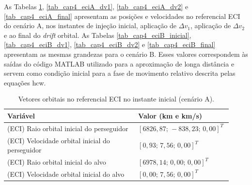 \label{ap_ApendiceA}

As Tabelas \ref{tab_cap4_eciA_inicial}, \ref{tab_cap4_eciA_dv1}, \ref{tab_cap4_eciA_dv2} e \ref{tab_cap4_eciA_final}
apresentam as posições e velocidades no referencial ECI do cenário A, nos instantes de injeção inicial, aplicação de $\Delta v_1$,
aplicação de $\Delta v_2$ e ao final do \emph{drift} orbital.
As Tabelas \ref{tab_cap4_eciB_inicial}, \ref{tab_cap4_eciB_dv1}, \ref{tab_cap4_eciB_dv2} e \ref{tab_cap4_eciB_final}
apresentam as mesmas grandezas para o cenário B.
Esses valores correspondem às saídas do código MATLAB utilizado para a aproximação de longa distância e servem como condição inicial para a fase de movimento relativo descrita pelas equações \gls{hcw}.


\begin{table}[H]
\centering
\caption{Vetores orbitais no referencial ECI no instante inicial (cenário A).}
\label{tab_cap4_eciA_inicial}
\begingroup
\small
\setlength{\tabcolsep}{4pt}
\renewcommand{\arraystretch}{1.15}
\begin{tabular}{|p{0.58\linewidth}|p{0.34\linewidth}|}
\hline
Variável & Valor (km e km/s)\\
\hline
(ECI) Raio orbital inicial do perseguidor &
$\left[6826,87;\,-838,23;\,0,00\right]^T$\\
\hline
(ECI) Velocidade orbital inicial do perseguidor &
$\left[0,93;\,7,56;\,0,00\right]^T$\\
\hline
(ECI) Raio orbital inicial do alvo &
$\left[6978,14;\,0,00;\,0,00\right]^T$\\
\hline
(ECI) Velocidade orbital inicial do alvo &
$\left[0,00;\,7,56;\,0,00\right]^T$\\
\hline
\end{tabular}
\endgroup
\end{table}

